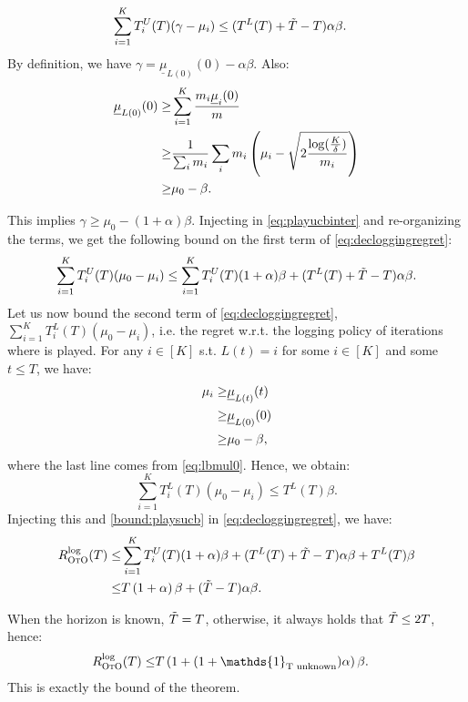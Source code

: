 \begin{align}
\sum_{i=1}^K T_i^U(T)(\gamma-\mu_i)
    &\leq (T^L(T)+\Tilde{T}-T)\alpha \beta.\label{eq:playucbinter}
\end{align}
By definition, we have $
    \gamma= \underline{\mu}_{L(0)}(0)-\alpha \beta.
$ Also:
\begin{align}
\underline{\mu}_{L(0)}(0)
      \geq &\sum_{i=1}^K\frac{m_i \underline{\mu}_{i}(0)}{m}\notag\\
      \geq &\frac{1}{\sum_i m_i}\sum_i m_i\left(\mu_i-\sqrt{2\frac{\log(\frac{K}{\delta})}{m_i}}\right)\notag\\
      \geq& \mu_0-\beta. \label{eq:lbmul0}
\end{align}

This implies $
   \gamma \geq \mu_0-\left(1+\alpha\right)\beta.
$
Injecting in \cref{eq:playucbinter} and re-organizing the terms,
we get the following bound on the first term of \cref{eq:decloggingregret}:
\begin{align}\label{bound:playsucb}
\sum_{i=1}^K T_i^U(T)(\mu_0-\mu_i)\leq \sum_{i=1}^{K}T_i^U(T)(1+\alpha)\beta+(T^L(T)+\Tilde{T}-T)\alpha \beta.
\end{align}
Let us now bound the second term of \cref{eq:decloggingregret}, $\sum_{i=1}^{K}T_i^L(T)\left(\mu_0-\mu_i\right)$, i.e. the regret w.r.t. the logging policy of iterations where \alglcb is played. For any $i \in [K]$ s.t. $L(t)=i$ for some $i\in [K]$ and some $t\leq T$, we have:
\begin{align}
\mu_i\geq& \underline{\mu}_{L(t)}(t)\notag\\
\geq& \underline{\mu}_{L(0)}(0)\notag\\
      \geq& \mu_0-\beta, \label{eq:lbmult}
\end{align}
where the last line comes from \cref{eq:lbmul0}.
Hence, we obtain:
\begin{equation*}
    \sum_{i=1}^{K}T_i^L(T)\left(\mu_0-\mu_i\right)\leq T^L(T)\beta.
\end{equation*}
Injecting this and \cref{bound:playsucb} in \cref{eq:decloggingregret}, we have:
\begin{align*}
    R^{\text{log}}_\textsc{OtO}(T)\leq &\sum_{i=1}^{K}T_i^U(T)(1+\alpha)\beta+(T^L(T)+\Tilde{T}-T)\alpha \beta+ T^L(T)\beta\\
    \leq& T\left(1+\alpha\right)\beta +(\Tilde{T}-T)\alpha \beta.
\end{align*}

When the horizon is known, $\Tilde{T}=T$, otherwise, it always holds that $\Tilde{T}\leq 2T$, hence:
\begin{align*}
   R^{\text{log}}_\algoname(T)\leq &T\left(1+(1+\mathds{1}_{\text{T unknown}})\alpha\right)\beta.   
\end{align*}
This is exactly the bound of the theorem.


